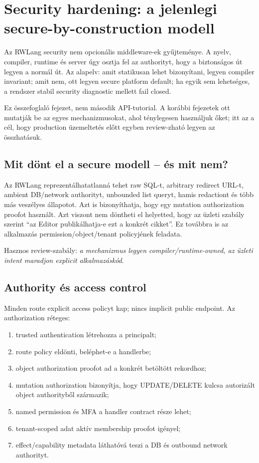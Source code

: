 \chapter{Security hardening: a jelenlegi secure-by-construction modell}

Az RWLang security nem opcionális middleware-ek gyűjteménye. A nyelv, compiler, runtime és server úgy osztja fel az authorityt, hogy a biztonságos út legyen a normál út. Az alapelv: amit statikusan lehet bizonyítani, legyen compiler invariant; amit nem, ott legyen secure platform default; ha egyik sem lehetséges, a rendszer stabil security diagnostic mellett fail closed.

Ez összefoglaló fejezet, nem második API-tutorial. A korábbi fejezetek ott mutatják be az egyes mechanizmusokat, ahol ténylegesen használjuk őket; itt az a cél, hogy production üzemeltetés előtt egyben review-zható legyen az összhatásuk.

\section{Mit dönt el a secure modell -- és mit nem?}

Az RWLang reprezentálhatatlanná tehet raw SQL-t, arbitrary redirect URL-t, ambient DB/network authorityt, unbounded list queryt, hamis redactiont és több más veszélyes állapotot. Azt is bizonyíthatja, hogy egy mutation authorization proofot használt. Azt viszont nem döntheti el helyetted, hogy az üzleti szabály szerint ``az Editor publikálhatja-e ezt a konkrét cikket''. Ez továbbra is az alkalmazás permission/object/tenant policyjének feladata.

Hasznos review-szabály: \emph{a mechanizmus legyen compiler/runtime-owned, az üzleti intent maradjon explicit alkalmazáskód}.

\section{Authority és access control}

Minden route explicit access policyt kap; nincs implicit public endpoint. Az authorization réteges:

\begin{enumerate}
  \item trusted authentication létrehozza a principalt;
  \item route policy eldönti, beléphet-e a handlerbe;
  \item object authorization proofot ad a konkrét betöltött rekordhoz;
  \item mutation authorization bizonyítja, hogy UPDATE/DELETE kulcsa autorizált object authorityből származik;
  \item named permission és MFA a handler contract része lehet;
  \item tenant-scoped adat aktív membership proofot igényel;
  \item effect/capability metadata láthatóvá teszi a DB és outbound network authorityt.
\end{enumerate}

